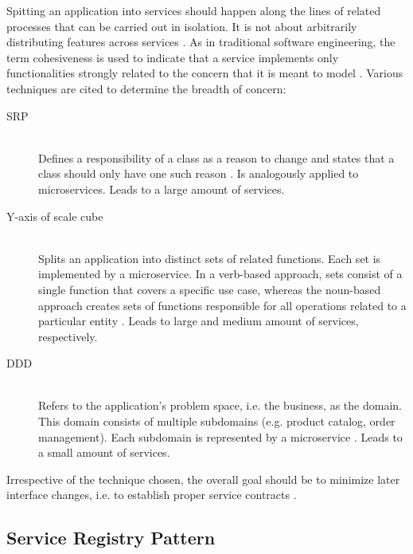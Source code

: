 Spitting an application into services should happen along the lines of related processes that can be carried out in isolation. It is not about arbitrarily distributing features across services \cite[p.~61]{taibi2018definition}. As in traditional software engineering, the term cohesiveness is used to indicate that a service implements only functionalities strongly related to the concern that it is meant to model \cite[p.~2]{dragoni2017microservices}. Various techniques are cited to determine the breadth of concern:

\begin{description}
  \item[\acl{SRP}]
  \hfill \\
  Defines a responsibility of a class as a reason to change and states that a class should only have one such reason \cite[p.~36]{messina2016simplified} \cite[p.~116]{thones2015microservices}. Is analogously applied to microservices. Leads to a large amount of services.

  \item[Y-axis of \gls{scale cube}]
  \hfill \\
  Splits an application into distinct sets of related functions. Each set is implemented by a microservice. In a verb-based approach, sets consist of a single function that covers a specific use case, whereas the noun-based approach creates sets of functions responsible for all operations related to a particular entity \cite[p.~36]{messina2016simplified}. Leads to large and medium amount of services, respectively.

  \item[\acl{DDD}]
  \hfill \\
  Refers to the application's problem space, i.e. the business, as the domain. This domain consists of multiple subdomains (e.g. product catalog, order management). Each subdomain is represented by a microservice \cite[p.~3]{balalaie2016microservices}. Leads to a small amount of services.
\end{description}

Irrespective of the technique chosen, the overall goal should be to minimize later interface changes, i.e. to establish proper service contracts \cite[p.~26]{dmitry2014micro}.


\subsection{Service Registry Pattern}
\label{sec:service-registry-pattern}

